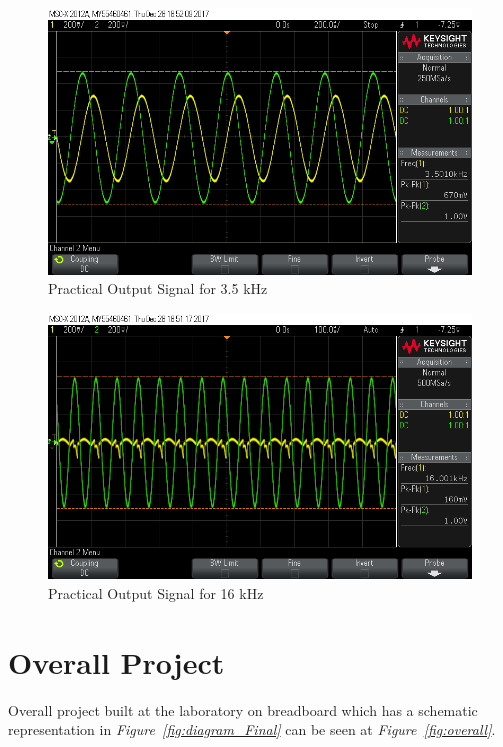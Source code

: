 \documentclass[paper]{IEEEtran}
\begin{document}
\begin{figure}[H]
	\setlength{\unitlength}{\textwidth}
	\center 
	\includegraphics[width=0.45\unitlength]{lpf_osc5.png}
	\caption{\label{fig:lpfosc5}Practical Output Signal for 3.5 kHz}
\end{figure} 
		

\begin{figure}[H]
	\setlength{\unitlength}{\textwidth}
	\center 
	\includegraphics[width=0.45\unitlength]{lpf_osc2.png}
	\caption{\label{fig:lpfosc2}Practical Output Signal for 16 kHz}
\end{figure} 
		
\section{Overall Project}


	Overall project built at the laboratory on breadboard which has a schematic representation in \textit{Figure~\ref{fig:diagram_Final}} can be seen at \textit{Figure~\ref{fig:overall}}.
\end{document}
